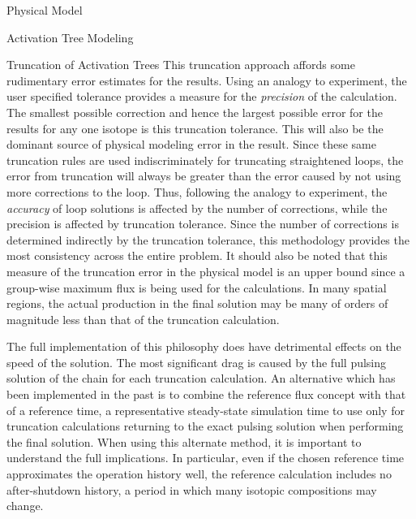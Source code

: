\begin{chapter}{Physical Model\label{chap:physical}}
\begin{section}{Activation Tree Modeling\label{sec:physical.chains}}
\begin{subsection}{Truncation of Activation Trees\label{sec:physical.chains.trunc}}
    This truncation approach affords some rudimentary error estimates
    for the results.  Using an analogy to experiment, the user
    specified tolerance provides a measure for the \textsl{precision}
    of the calculation.  The smallest possible correction and hence
    the largest possible error for the results for any one isotope is
    this truncation tolerance.  This will also be the dominant source
    of physical modeling error in the result.  Since these same
    truncation rules are used indiscriminately for truncating
    straightened loops, the error from truncation will always be
    greater than the error caused by not using more corrections to the
    loop.  Thus, following the analogy to experiment, the
    \textsl{accuracy} of loop solutions is affected by the number of
    corrections, while the precision is affected by truncation
    tolerance.  Since the number of corrections is determined
    indirectly by the truncation tolerance, this methodology provides
    the most consistency across the entire problem.  It should also be
    noted that this measure of the truncation error in the physical
    model is an upper bound since a group-wise maximum flux is being
    used for the calculations.  In many spatial regions, the actual
    production in the final solution may be many of orders of
    magnitude less than that of the truncation calculation.
    
    The full implementation of this philosophy does have detrimental
    effects on the speed of the solution.  The most significant drag
    is caused by the full pulsing solution of the chain for each
    truncation calculation.  An alternative which has been implemented
    in the past is to combine the reference flux concept with that of
    a reference time, a representative steady-state simulation time to
    use only for truncation calculations returning to the exact
    pulsing solution when performing the final solution.  When using
    this alternate method, it is important to understand the full
    implications.  In particular, even if the chosen reference time
    approximates the operation history well, the reference calculation
    includes no after-shutdown history, a period in which many
    isotopic compositions may change.
    

\end{subsection}
\end{section}
\end{chapter}
